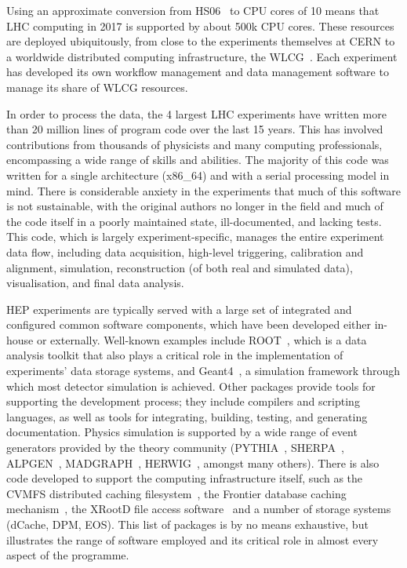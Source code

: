 \documentclass[twocolumn]{svjour3}          %
\begin{document}
Using an approximate conversion from HS06~\cite{HS06} to CPU cores of 10
means that LHC computing in 2017 is supported by about 500k CPU cores.
These resources are deployed ubiquitously, from close to the experiments
themselves at CERN to a worldwide distributed computing infrastructure,
the WLCG~\cite{WLCG}. Each experiment has developed its own workflow management and
data management software to manage its share of WLCG resources.

In order to process the data, the 4 largest LHC experiments have written
more than 20 million lines of program code over the last 15 years. This
has involved contributions from thousands of physicists and many
computing professionals, encompassing a wide range of skills and
abilities. The majority of this code was written for a single
architecture (x86\_64) and with a serial processing model in mind. There
is considerable anxiety in the experiments that much of this software is
not sustainable, with the original authors no longer in the field and
much of the code itself in a poorly maintained state, ill-documented, and
lacking tests. This code, which is largely experiment-specific, manages
the entire experiment data flow, including data acquisition, high-level
triggering, calibration and alignment, simulation, reconstruction (of
both real and simulated data), visualisation, and final data analysis.

HEP experiments are typically served with a large set of integrated and
configured common software components, which have been developed either
in-house or externally. Well-known examples include ROOT~\cite{Brun1996}, which is a data analysis toolkit that
also plays a critical role in the implementation of experiments' data
storage systems, and Geant4~\cite{Agostinelli2003}, a
simulation framework through which most detector simulation is achieved.
Other packages provide tools for supporting the development process;
they include compilers and scripting languages, as well as tools for
integrating, building, testing, and generating documentation. Physics
simulation is supported by a wide range of event generators provided by
the theory community (PYTHIA~\cite{PYTHIA}, SHERPA~\cite{Gleisberg:2008ta}, ALPGEN~\cite{Mangano:565290}, MADGRAPH~\cite{MADGRAPH}, HERWIG~\cite{HERWIG},
amongst many others). There is also code developed to support the
computing infrastructure itself, such as the CVMFS distributed caching
filesystem~\cite{1742-6596-331-4-042003}, the Frontier database caching 
mechanism~\cite{Frontier}, the XRootD file access software~\cite{XRootD} and a
number of storage systems (dCache, DPM, EOS). This list of packages is %
by no means exhaustive, but illustrates the range of software employed
and its critical role in almost every aspect of the programme.
\end{document}
